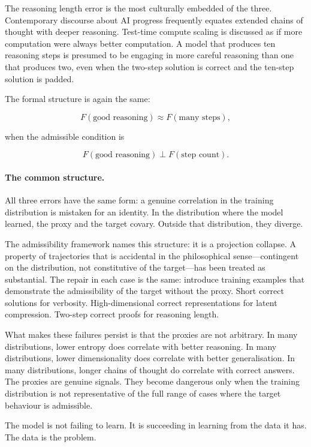 \documentclass[11pt]{article}
\theoremstyle{rthm}
\theoremstyle{rdef}
\theoremstyle{remark}
\begin{document}
The reasoning length error is the most culturally embedded of the
three. Contemporary discourse about AI progress frequently equates
extended chains of thought with deeper reasoning. Test-time
compute scaling is discussed as if more computation were always
better computation. A model that produces ten reasoning steps is
presumed to be engaging in more careful reasoning than one that
produces two, even when the two-step solution is correct and the
ten-step solution is padded.

The formal structure is again the same:

\[
F(\text{good reasoning}) \approx F(\text{many steps}),
\]

when the admissible condition is

\[
F(\text{good reasoning}) \perp F(\text{step count}).
\]

\paragraph{The common structure.}

All three errors have the same form: a genuine correlation in the
training distribution is mistaken for an identity. In the
distribution where the model learned, the proxy and the target
covary. Outside that distribution, they diverge.

The admissibility framework names this structure: it is a projection
collapse. A property of trajectories that is accidental in the
philosophical sense---contingent on the distribution, not
constitutive of the target---has been treated as substantial.
The repair in each case is the same: introduce training examples
that demonstrate the admissibility of the target without the proxy.
Short correct solutions for verbosity. High-dimensional correct
representations for latent compression. Two-step correct proofs
for reasoning length.

What makes these failures persist is that the proxies are not
arbitrary. In many distributions, lower entropy does correlate
with better reasoning. In many distributions, lower dimensionality
does correlate with better generalisation. In many distributions,
longer chains of thought do correlate with correct answers. The
proxies are genuine signals. They become dangerous only when the
training distribution is not representative of the full range of
cases where the target behaviour is admissible.

The model is not failing to learn. It is succeeding in learning
from the data it has. The data is the problem.
\end{document}
